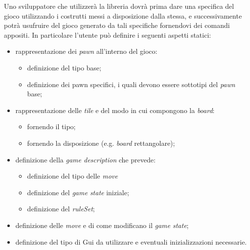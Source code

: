 Uno sviluppatore che utilizzerà la libreria dovrà prima dare una specifica del gioco utilizzando i costrutti messi a disposizione dalla stessa, e successivamente potrà usufruire del gioco generato da tali specifiche fornendovi dei comandi appositi.
%
In particolare l'utente può definire i seguenti aspetti statici:
%
\begin{itemize}
    \item rappresentazione dei \textit{pawn} all'interno del gioco:
          \begin{itemize}
              \item definizione del tipo base;
              \item definizione dei pawn specifici, i quali devono essere sottotipi del \textit{pawn} base;
          \end{itemize}
    \item rappresentazione delle \textit{tile} e del modo in cui compongono la \textit{board}:
          \begin{itemize}
              \item fornendo il tipo;
              \item fornendo la disposizione (e.g. \textit{board} rettangolare);
          \end{itemize}
    \item definizione della \textit{game description} che prevede: 
        \begin{itemize}
            \item definizione del tipo delle \textit{move}
            \item definizione del \textit{game state} iniziale;
            \item definizione del \textit{ruleSet};
        \end{itemize}
    \item definizione delle \textit{move} e di come modificano il \textit{game state};
    \item definizione del tipo di Gui da utilizzare e eventuali inizializzazioni necessarie.
\end{itemize}
%

